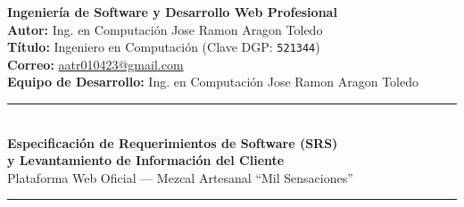 \documentclass[11pt,letterpaper]{article}
\begin{document}
\begin{titlepage}
    \begin{flushright}
        \small
        \textbf{Ingeniería de Software y Desarrollo Web Profesional}\\
        \textbf{Autor:} Ing. en Computación Jose Ramon Aragon Toledo\\
        \textbf{Título:} Ingeniero en Computación (Clave DGP: \texttt{521344})\\
        \textbf{Correo:} \href{mailto:aatr010423@gmail.com}{aatr010423@gmail.com}\\
        \textbf{Equipo de Desarrollo:} Ing. en Computación Jose Ramon Aragon Toledo
    \end{flushright}

    \vspace{1.2cm}

    \begin{center}
        {\color{mezcalEarth}\rule{\linewidth}{2pt}}\\[0.4cm]
        {\Huge\bfseries\textcolor{mezcalDark}{Especificación de Requerimientos de Software (SRS)}}\\[0.3cm]
        {\LARGE\bfseries\textcolor{mezcalEarth}{y Levantamiento de Información del Cliente}}\\[0.3cm]
        {\Large\textcolor{mezcalAgave}{Plataforma Web Oficial — Mezcal Artesanal ``Mil Sensaciones''}}\\[0.2cm]
        {\color{mezcalEarth}\rule{\linewidth}{2pt}}
    \end{center}

    \vspace{0.8cm}


\end{titlepage}
\end{document}
